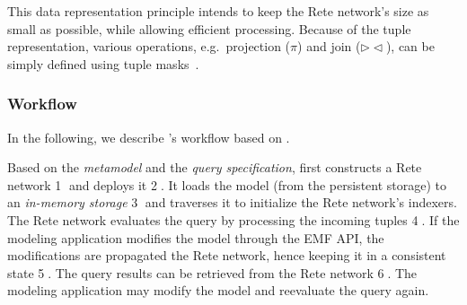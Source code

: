 This data representation principle intends to keep the Rete network's size as small as possible, while allowing efficient processing. Because of the tuple representation, various operations, e.g.\ projection ($ \pi $) and join ($ \rhd\!\!\lhd $), can be simply defined using tuple masks~\cite{BergmannMasters}.

\subsubsection{Workflow}
\label{eiq-workflow}


In the following, we describe \eiq{}'s workflow based on . 

Based on the \emph{metamodel} and the \emph{query specification}, \iqd{} first constructs a Rete network \textcircled{1} and deploys it \textcircled{2}. It loads the model (from the persistent storage) to an \emph{in-memory storage} \textcircled{3} and traverses it to initialize the Rete network's indexers. The Rete network evaluates the query by processing the incoming tuples \textcircled{4}. If the modeling application modifies the model through the EMF API, the modifications are propagated the Rete network, hence keeping it in a consistent state \textcircled{5}. The query results can be retrieved from the Rete network \textcircled{6}. The modeling application may modify the model and reevaluate the query again.
